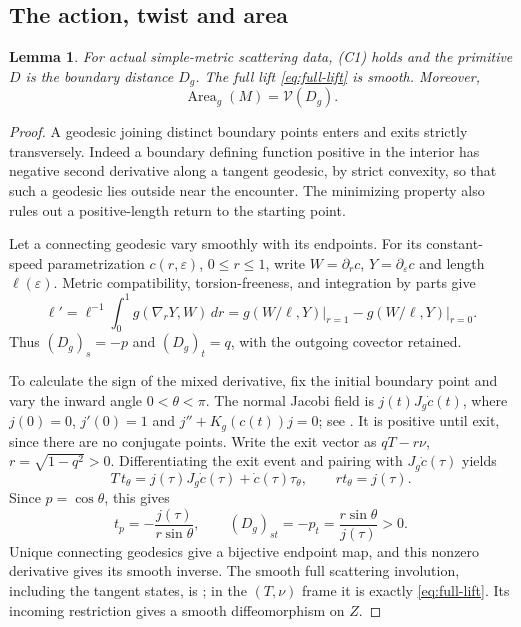\documentclass[11pt]{article}
\newtheorem{lemma}[theorem]{Lemma}
\theoremstyle{remark}
\newcommand{\Varea}{\mathcal V}
\newcommand{\dd}{\,d}
\DeclareMathOperator{\Area}{Area}
\begin{document}
\subsection{The action, twist and area}\label{subsec:geometry}
\begin{lemma}\label{lem:geometry}
For actual simple-metric scattering data, (C1) holds and the primitive
$D$ is the boundary distance $D_g$. The full lift \eqref{eq:full-lift}
is smooth. Moreover,
\begin{equation}\label{eq:santalo-area}
 \Area_g(M)=\Varea(D_g).
\end{equation}
\end{lemma}
\begin{proof}
A geodesic joining distinct boundary points enters and exits strictly
transversely. Indeed a boundary defining function positive in the
interior has negative second derivative along a tangent geodesic, by
strict convexity, so that such a geodesic lies outside near the encounter.
The minimizing property also rules out a positive-length return to the
starting point.

Let a connecting geodesic vary smoothly with its endpoints. For its
constant-speed parametrization $c(r,\varepsilon)$, $0\le r\le1$,
write $W=\partial_r c$, $Y=\partial_\varepsilon c$ and length
$\ell(\varepsilon)$. Metric compatibility, torsion-freeness, and integration
by parts give
\[
 \ell'=\ell^{-1}\int_0^1 g(\nabla_rY,W)\dd r
        =g(W/\ell,Y)\big|_{r=1}-g(W/\ell,Y)\big|_{r=0}.
\]
Thus $(D_g)_s=-p$ and $(D_g)_t=q$, with the outgoing covector retained.

To calculate the sign of the mixed derivative, fix the initial boundary
point and vary the inward angle $0<\theta<\pi$. The normal Jacobi field
is $j(t)J_g\dot c(t)$, where $j(0)=0$, $j'(0)=1$ and
$j''+K_g(c(t))j=0$; see \cite[Lemmas~3.7.2, 3.7.6 and 3.7.7]{PSU}.
It is positive until exit, since there are no conjugate points.
Write the exit vector as $qT-r\nu$, $r=\sqrt{1-q^2}>0$.
Differentiating the exit event and pairing with $J_g\dot c(\tau)$ yields
\[
 T\,t_\theta=j(\tau)J_g\dot c(\tau)+\dot c(\tau)\tau_\theta,
 \qquad r t_\theta=j(\tau).
\]
Since $p=\cos\theta$, this gives
\begin{equation}\label{eq:twist}
 t_p=-\frac{j(\tau)}{r\sin\theta},\qquad
 (D_g)_{st}=-p_t=\frac{r\sin\theta}{j(\tau)}>0.
\end{equation}
Unique connecting geodesics give a bijective endpoint map, and this
nonzero derivative gives its smooth inverse. The smooth full scattering
involution, including the tangent states, is
\cite[Lemma~3.3.5]{PSU}; in the $(T,\nu)$ frame it is exactly
\eqref{eq:full-lift}. Its incoming restriction gives a smooth
diffeomorphism on $Z$.


\end{proof}
\end{document}
